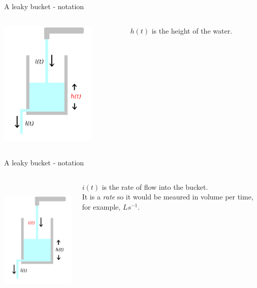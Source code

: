 \documentclass{beamer}
\newcommand{\crish}{\color{reddish}}
\newcommand{\cbla}{\color{black}}
\newcommand{\cred}{\color{red}}
\begin{document}
\begin{frame}{A leaky bucket - notation}
\begin{columns}
\begin{column}{0.5\textwidth}
  \begin{center}
     \includegraphics[height=6cm]{glass_h_red.png}      
     \end{center}
\end{column}
\begin{column}{0.5\textwidth}
\cred{} $h(t)$\color{black}{} is the height of the water.
\end{column}
\end{columns}
\end{frame}



\begin{frame}{A leaky bucket - notation}
\begin{columns}
\begin{column}{0.5\textwidth}
  \begin{center}
     \includegraphics[height=6cm]{glass_i_red.png}      
     \end{center}
\end{column}
\begin{column}{0.5\textwidth}
  \cred{} $i(t)$\color{black}{} is the rate of flow into the
  bucket.\\[1cm] It is a \textsl{rate} so it would be meaured in
  volume per time, for example, \crish$Ls^{-1}$\cbla.
\end{column}
\end{columns}
\end{frame}
\end{document}
